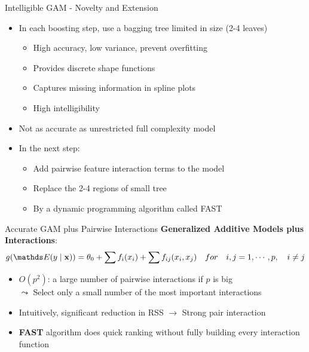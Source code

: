 \documentclass[10pt,compress,t,notes=noshow, xcolor=table]{beamer}
\begin{document}
\begin{frame}{Intelligible GAM - Novelty and Extension}
\begin{itemize}
    \item In each boosting step, use a bagging tree limited in size (2-4 leaves) \begin{itemize}
        \item High accuracy, low variance, prevent overfitting
        \item Provides discrete shape functions
        \item Captures missing information in spline plots
        \item High intelligibility
    \end{itemize}
    \item Not as accurate as unrestricted full complexity model
    \item In the next step: 
    \begin{itemize}
        \item Add pairwise feature interaction terms to the model
        \item Replace the 2-4 regions of small tree
        \item By a dynamic programming algorithm called FAST
    \end{itemize}
\end{itemize}
\end{frame}

\begin{frame}{Accurate GAM plus Pairwise Interactions}
\textbf{Generalized Additive Models plus Interactions}: $$g(\E (y \mid \xv)) = \theta_0 + \sum f_i(x_i) + \sum f_{ij}(x_i,x_j)\quad for\quad i,j=1,\cdots,p,\quad i\neq j$$
\begin{itemize}
    \item $O(p^2)$: a large number of pairwise interactions if $p$ is big\\
    $\leadsto$ Select only a small number of the most important interactions
    \item Intuitively, significant reduction in RSS $\to$ Strong pair interaction
    \item \textbf{FAST} algorithm does quick ranking without fully building every interaction function
\end{itemize}
\end{frame}
\end{document}

